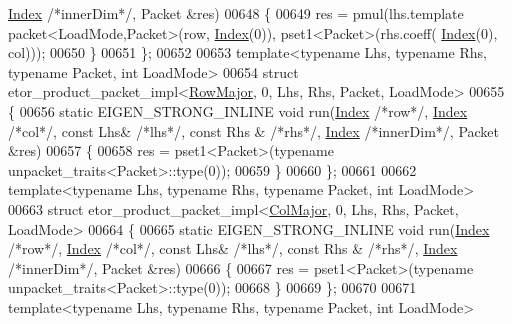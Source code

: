\begin{DoxyCode}
      \hyperlink{namespace_eigen_a62e77e0933482dafde8fe197d9a2cfde}{Index} \textcolor{comment}{/*innerDim*/}, Packet &res)
00648   \{
00649     res = pmul(lhs.template packet<LoadMode,Packet>(row, \hyperlink{namespace_eigen_a62e77e0933482dafde8fe197d9a2cfde}{Index}(0)), pset1<Packet>(rhs.coeff(
      \hyperlink{namespace_eigen_a62e77e0933482dafde8fe197d9a2cfde}{Index}(0), col)));
00650   \}
00651 \};
00652 
00653 \textcolor{keyword}{template}<\textcolor{keyword}{typename} Lhs, \textcolor{keyword}{typename} Rhs, \textcolor{keyword}{typename} Packet, \textcolor{keywordtype}{int} LoadMode>
00654 \textcolor{keyword}{struct }etor\_product\_packet\_impl<\hyperlink{group__enums_ggaacded1a18ae58b0f554751f6cdf9eb13acfcde9cd8677c5f7caf6bd603666aae3}{RowMajor}, 0, Lhs, Rhs, Packet, LoadMode>
00655 \{
00656   \textcolor{keyword}{static} EIGEN\_STRONG\_INLINE \textcolor{keywordtype}{void} run(\hyperlink{namespace_eigen_a62e77e0933482dafde8fe197d9a2cfde}{Index} \textcolor{comment}{/*row*/}, \hyperlink{namespace_eigen_a62e77e0933482dafde8fe197d9a2cfde}{Index} \textcolor{comment}{/*col*/}, \textcolor{keyword}{const} Lhs& \textcolor{comment}{/*lhs*/}, \textcolor{keyword}{const} Rhs
      & \textcolor{comment}{/*rhs*/}, \hyperlink{namespace_eigen_a62e77e0933482dafde8fe197d9a2cfde}{Index} \textcolor{comment}{/*innerDim*/}, Packet &res)
00657   \{
00658     res = pset1<Packet>(\textcolor{keyword}{typename} unpacket\_traits<Packet>::type(0));
00659   \}
00660 \};
00661 
00662 \textcolor{keyword}{template}<\textcolor{keyword}{typename} Lhs, \textcolor{keyword}{typename} Rhs, \textcolor{keyword}{typename} Packet, \textcolor{keywordtype}{int} LoadMode>
00663 \textcolor{keyword}{struct }etor\_product\_packet\_impl<\hyperlink{group__enums_ggaacded1a18ae58b0f554751f6cdf9eb13a0cbd4bdd0abcfc0224c5fcb5e4f6669a}{ColMajor}, 0, Lhs, Rhs, Packet, LoadMode>
00664 \{
00665   \textcolor{keyword}{static} EIGEN\_STRONG\_INLINE \textcolor{keywordtype}{void} run(\hyperlink{namespace_eigen_a62e77e0933482dafde8fe197d9a2cfde}{Index} \textcolor{comment}{/*row*/}, \hyperlink{namespace_eigen_a62e77e0933482dafde8fe197d9a2cfde}{Index} \textcolor{comment}{/*col*/}, \textcolor{keyword}{const} Lhs& \textcolor{comment}{/*lhs*/}, \textcolor{keyword}{const} Rhs
      & \textcolor{comment}{/*rhs*/}, \hyperlink{namespace_eigen_a62e77e0933482dafde8fe197d9a2cfde}{Index} \textcolor{comment}{/*innerDim*/}, Packet &res)
00666   \{
00667     res = pset1<Packet>(\textcolor{keyword}{typename} unpacket\_traits<Packet>::type(0));
00668   \}
00669 \};
00670 
00671 \textcolor{keyword}{template}<\textcolor{keyword}{typename} Lhs, \textcolor{keyword}{typename} Rhs, \textcolor{keyword}{typename} Packet, \textcolor{keywordtype}{int} LoadMode>

\end{DoxyCode}
